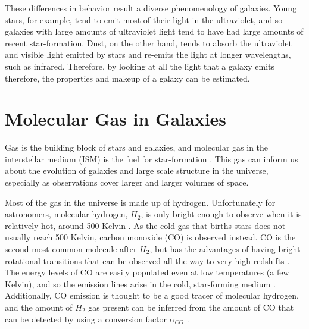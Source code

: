 \documentclass[twoside,single]{lion-msc}
\begin{document}
These differences in behavior result a diverse phenomenology of galaxies. Young stars, for example, tend to emit most of their light in the ultraviolet, and so galaxies with large amounts of ultraviolet light tend to have had large amounts of recent star-formation. Dust, on the other hand, tends to absorb the ultraviolet and visible light emitted by stars and re-emits the light at longer wavelengths, such as infrared. Therefore, by looking at all the light that a galaxy emits therefore, the properties and makeup of a galaxy can be estimated.

\section{Molecular Gas in Galaxies}

Gas is the building block of stars and galaxies, and molecular gas in the interstellar medium (ISM) is the fuel for star-formation \cite{decarli2019alma}. This gas can inform us about the evolution of galaxies and large scale structure in the universe, especially as observations cover larger and larger volumes of space. %


Most of the gas in the universe is made up of hydrogen. Unfortunately for astronomers, molecular hydrogen, $H_2$, is only bright enough to observe when it is relatively hot, around 500 Kelvin \cite{decarli2019alma}. As the cold gas that births stars does not usually reach 500 Kelvin, carbon monoxide (CO) is observed instead. CO is the second most common molecule after $H_2$, but has the advantages of having bright rotational transitions that can be observed all the way to very high redshifts \cite{carilli2013cool}. The energy levels of CO are easily populated even at low temperatures (a few Kelvin), and so the emission lines arise in the cold, star-forming medium \cite{carilli2013cool}. Additionally, CO emission is thought to be a good tracer of molecular hydrogen, and the amount of $H_2$ gas present can be inferred from the amount of CO that can be detected by using a conversion factor $\alpha_{CO}$ \cite{bolatto2013co}. 
\end{document}

